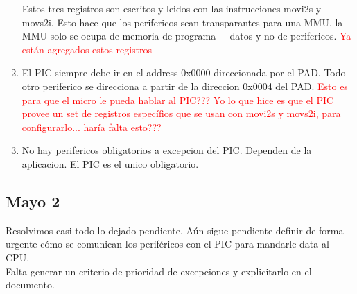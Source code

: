 \begin{enumerate}
	Estos tres registros son escritos y leidos con las instrucciones movi2s y movs2i. Esto hace que los perifericos sean transparantes para una MMU, la MMU solo se ocupa de memoria de programa + datos y no de perifericos.
	\textcolor{red}{Ya están agregados estos registros}
  \item El PIC siempre debe ir en el address 0x0000 direccionada por el PAD. Todo otro periferico se direcciona a partir de la direccion 0x0004 del PAD.
        \textcolor{red}{Esto es para que el micro le pueda hablar al PIC??? Yo lo que hice es que el PIC provee un set de registros específios que se
        usan con movi2s y movs2i, para configurarlo... haría falta esto???}
  \item No hay perifericos obligatorios a excepcion del PIC. Dependen de la aplicacion. El PIC es el unico obligatorio.
\end{enumerate}

\subsection{Mayo 2}
Resolvimos casi todo lo dejado pendiente. Aún sigue pendiente definir de forma urgente cómo se comunican los periféricos con el PIC para mandarle data al CPU.\\
Falta generar un criterio de prioridad de excepciones y explicitarlo en el documento.\\

